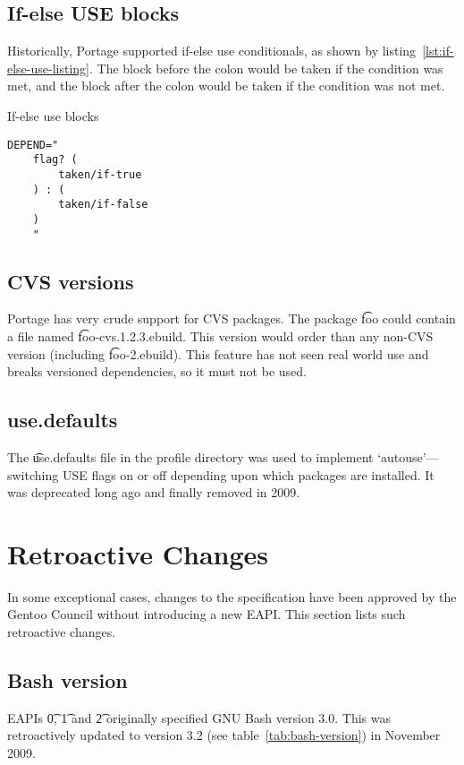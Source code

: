 \subsection{If-else USE blocks}
Historically, Portage supported if-else use conditionals, as shown by
listing~\ref{lst:if-else-use-listing}. The block before the colon would be taken if the condition
was met, and the block after the colon would be taken if the condition was not met.

\begin{listing}
\caption{If-else use blocks} \label{lst:if-else-use-listing}
\begin{verbatim}
DEPEND="
    flag? (
        taken/if-true
    ) : (
        taken/if-false
    )
    "
\end{verbatim}
\end{listing}

\subsection{CVS versions}
Portage has very crude support for CVS packages. The package \t{foo} could contain a file named
\t{foo-cvs.1.2.3.ebuild}. This version would order  than any non-CVS version (including
\t{foo-2.ebuild}). This feature has not seen real world use and breaks versioned dependencies, so
it must not be used.

\subsection{use.defaults}
The \t{use.defaults} file in the profile directory was used to implement `autouse'---switching USE
flags on or off depending upon which packages are installed. It was deprecated long ago and finally
removed in 2009.

\section{Retroactive Changes}

In some exceptional cases, changes to the specification have been approved by the Gentoo Council
without introducing a new EAPI\@. This section lists such retroactive changes.

\subsection{Bash version}
EAPIs \t{0}, \t{1} and \t{2} originally specified GNU Bash version 3.0. This was retroactively
updated to version 3.2 (see table~\ref{tab:bash-version}) in November 2009.

